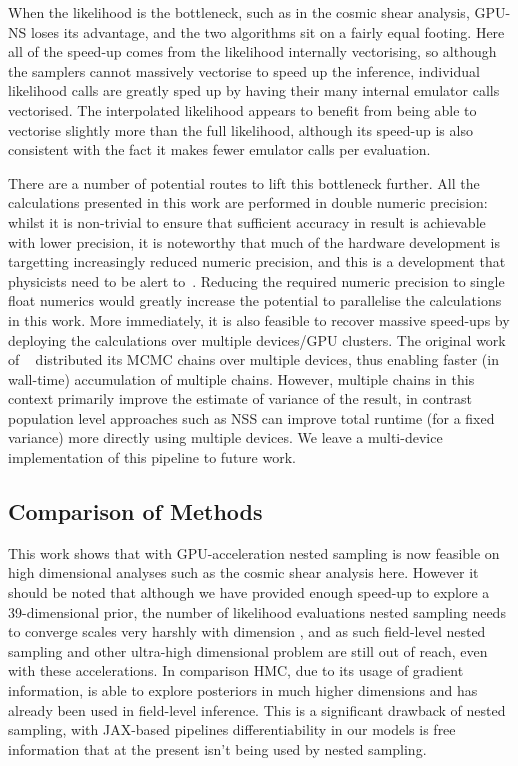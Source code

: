 \documentclass[twocolumn]{openjournal}
\begin{document}
When the likelihood is the bottleneck, such as in the cosmic shear analysis, GPU-NS loses its advantage, and the two algorithms sit on a fairly equal footing. Here all of the speed-up comes from the likelihood internally vectorising, so although the samplers cannot massively vectorise to speed up the inference, individual likelihood calls are greatly sped up by having their many internal emulator calls vectorised. The interpolated likelihood appears to benefit from being able to vectorise slightly more than the full likelihood, although its speed-up is also consistent with the fact it makes fewer emulator calls per evaluation. 

There are a number of potential routes to lift this bottleneck further. All the calculations presented in this work are performed in double numeric precision: whilst it is non-trivial to ensure that sufficient accuracy in result is achievable with lower precision, it is noteworthy that much of the hardware development is targetting increasingly reduced numeric precision, and this is a development that physicists need to be alert to~\citep{jacob2017quantizationtrainingneuralnetworks}. Reducing the required numeric precision to single float numerics would greatly increase the potential to parallelise the calculations in this work. More immediately, it is also feasible to recover massive speed-ups by deploying the calculations over multiple devices/GPU clusters. The original work of ~\citet{Piras_2024} distributed its MCMC chains over multiple devices, thus enabling faster (in wall-time) accumulation of multiple chains. However, multiple chains in this context primarily improve the estimate of variance of the result, in contrast population level approaches such as NSS can improve total runtime (for a fixed variance) more directly using multiple devices. We leave a multi-device implementation of this pipeline to future work.

\subsection{Comparison of Methods}
This work shows that with GPU-acceleration nested sampling is now feasible on high dimensional analyses such as the cosmic shear analysis here. However it should be noted that although we have provided enough speed-up to explore a 39-dimensional prior, the number of likelihood evaluations nested sampling needs to converge scales very harshly with dimension \citep{polychord}, and as such field-level nested sampling and other ultra-high dimensional problem are still out of reach, even with these accelerations. In comparison HMC, due to its usage of gradient information, is able to explore posteriors in much higher dimensions and has already been used in field-level inference. This is a significant drawback of nested sampling, with JAX-based pipelines differentiability in our models is free information that at the present isn't being used by nested sampling.
\end{document}
